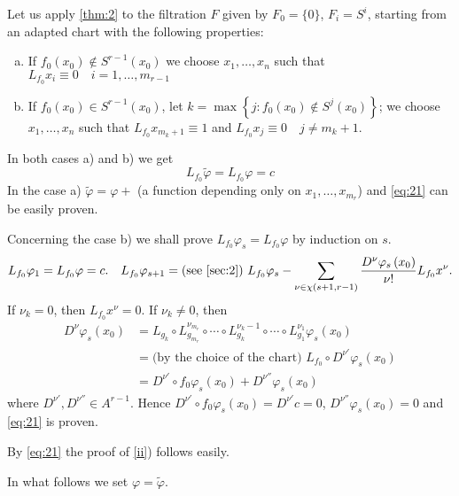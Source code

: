 \documentclass{article}
\begin{document}
Let us apply \cref{thm:2} to the filtration $F$ given by $F_0=\{0\}$, $F_i=S^i$, starting from an adapted chart with the following properties:
\begin{enumerate}[a)]
	\item If $f_0\left(x_0\right)\notin S^{r-1}\left(x_0\right)$ we choose $x_1, \ldots, x_n$ such that $L_{f_0} x_i \equiv 0 \quad i=1, \ldots, m_{r-1}$
	\item If $f_0\left(x_0\right) \in S^{r-1}\left(x_0\right)$, let $k=\max \left\{j: f_0\left(x_0\right) \notin S^j\left(x_0\right)\right\}$; we choose $x_1, \ldots, x_n$ such that $L_{f_0} x_{m_k+1} \equiv 1$ and $L_{f_0} x_j \equiv 0 \quad j \neq m_k+1$.
\end{enumerate}
In both cases a) and b) we get
\begin{equation}
	\label{eq:21}
	L_{f_0} \tilde{\varphi}=L_{f_0} \varphi=c
\end{equation}
In the case a) $\tilde{\varphi}=\varphi+$ (a function depending only on $x_1, \ldots, x_{m_r}$) and \eqref{eq:21} can be easily proven.

Concerning the case b) we shall prove $L_{f_0} \varphi_s=L_{f_0} \varphi$ by induction on $s$.
\begin{equation*}
	L_{f_0} \varphi_1=L_{f_0} \varphi=c.
	\quad
	 L_{f_0} \varphi_{s+1}= \text{(see \cref{sec:2}) } 
	 L_{f_0} \varphi_s-\sum_{\nu \in \chi(s+1, r-1)} \frac{D^\nu \varphi_s\left(x_0\right)}{\nu!} L_{f_0} x^\nu.
\end{equation*}
If $\nu_k=0$, then $L_{f_0} x^\nu = 0$.
If $\nu_k \neq 0$, then 
\begin{equation*}
	\begin{split}
		D^\nu \varphi_s(x_0)
		& = L_{g_k} \circ L_{g_{m_r}}^{\nu_{m_r}} \circ \dotsb \circ L^{\nu_k-1}_{g_k} \circ \dotsb \circ L_{g_1}^{\nu_1} \varphi_s (x_0) \\
		& = \text{(by the choice of the chart) }
		L_{f_0} \circ D^{\nu'} \varphi_s(x_0) \\
		& = D^{\nu'} \circ f_0 \varphi_s(x_0) + D^{\nu''} \varphi_s(x_0)
	\end{split}
\end{equation*}
where $D^{\nu'}, D^{\nu''} \in A^{r-1}$.
Hence $D^{\nu'} \circ f_0 \varphi_s(x_0) = D^{\nu'} c = 0$, $D^{\nu''} \varphi_s(x_0) = 0$ and \eqref{eq:21} is proven.

By \eqref{eq:21} the proof of \ref{ii}) follows easily.

In what follows we set $\varphi=\tilde{\varphi}$.
\end{document}
